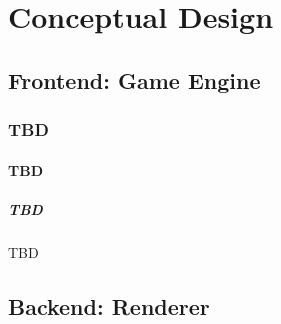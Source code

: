 \chapter{Conceptual Design}

\section{Frontend: Game Engine}

\subsection{TBD}

\subsubsection{TBD}
 
\paragraph{TBD} TBD


\section{Backend: Renderer}